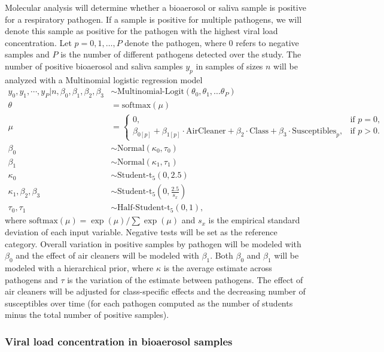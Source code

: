 \documentclass{article}
\begin{document}
Molecular analysis will determine whether a bioaerosol or saliva sample is positive for a respiratory pathogen. If a sample is positive for multiple pathogens, we will denote this sample as positive for the pathogen with the highest viral load concentration. Let $p = 0, 1, \dots, P$ denote the pathogen, where $0$ refers to negative samples and $P$ is the number of different pathogens detected over the study. The number of positive bioaerosol and saliva samples $y_p$ in samples of sizes $n$ will be analyzed with a Multinomial logistic regression model
\begin{align*}
    y_0, y_1, \cdots, y_P | n, \beta_0, \beta_1, \beta_2, \beta_3 &\sim \text{Multinomial-Logit}(\theta_0, \theta_1, \dots \theta_P) \\
    \theta &= \text{softmax}(\mu) \\
    \mu &= \begin{cases}
                0, & \text{if } p=0, \\
                \beta_{0[p]} + \beta_{1[p]} \cdot \text{AirCleaner} + \beta_2 \cdot \text{Class} + \beta_3 \cdot \text{Susceptibles}_p, & \text{if } p>0.
            \end{cases} \\
    \beta_0 &\sim \text{Normal}(\kappa_0, \tau_0) \\
    \beta_1 &\sim \text{Normal}(\kappa_1, \tau_1) \\
    \kappa_0 &\sim \text{Student-t}_5(0, 2.5) \\
    \kappa_1, \beta_2, \beta_3 &\sim \text{Student-t}_5\left(0, \frac{2.5}{s_{x}}\right) \\
    \tau_0, \tau_1 &\sim \text{Half-Student-t}_5(0,1),
\end{align*}
where $\text{softmax}(\mu) = \exp(\mu)/\sum\exp(\mu)$ and $s_{x}$ is the empirical standard deviation of each input variable.  Negative tests will be set as the reference category. Overall variation in positive samples by pathogen will be modeled with $\beta_0$ and the effect of air cleaners will be modeled with $\beta_1$. Both $\beta_0$ and $\beta_1$ will be modeled with a hierarchical prior, where $\kappa$ is the average estimate across pathogens and $\tau$ is the variation of the estimate between pathogens. The effect of air cleaners will be adjusted for class-specific effects and the decreasing number of susceptibles over time (for each pathogen computed as the number of students minus the total number of positive samples). 

\subsubsection{Viral load concentration in bioaerosol samples}\label{subsubsec:viral_load}
\end{document}
